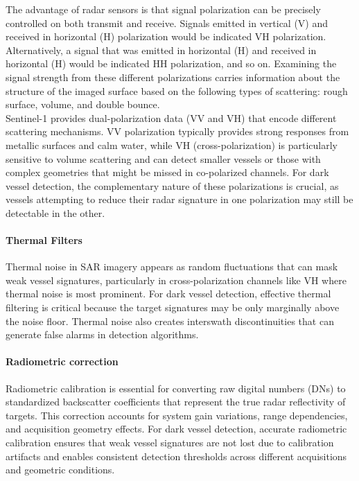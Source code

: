 \documentclass{article}
\begin{document}
	The advantage of radar sensors is that signal polarization can be precisely controlled on both transmit and receive. Signals emitted in vertical (V) and received in horizontal (H) polarization would be indicated VH polarization. Alternatively, a signal that was emitted in horizontal (H) and received in horizontal
	(H) would be indicated HH polarization, and so on. Examining the signal strength from these different polarizations carries information about the structure of the imaged surface based on the following types of scattering: rough surface, volume, and double bounce.\\
	
	
	Sentinel-1 provides dual-polarization data (VV and VH) that encode different scattering mechanisms. VV polarization typically provides strong responses from metallic surfaces and calm water, while VH (cross-polarization) is particularly sensitive to volume scattering and can detect smaller vessels or those with complex geometries that might be missed in co-polarized channels. For dark vessel detection, the complementary nature of these polarizations is crucial, as vessels attempting to reduce their radar signature in one polarization may still be detectable in the other.\\
	
	\paragraph{Thermal Filters}
	Thermal noise in SAR imagery appears as random fluctuations that can mask weak vessel signatures, particularly in cross-polarization channels like VH where thermal noise is most prominent. For dark vessel detection, effective thermal filtering is critical because the target signatures may be only marginally above the noise floor. Thermal noise also creates interswath discontinuities that can generate false alarms in detection algorithms. \\
	
	\paragraph{Radiometric correction}
	Radiometric calibration is essential for converting raw digital numbers (DNs) to standardized backscatter coefficients that represent the true radar reflectivity of targets. This correction accounts for system gain variations, range dependencies, and acquisition geometry effects. For dark vessel detection, accurate radiometric calibration ensures that weak vessel signatures are not lost due to calibration artifacts and enables consistent detection thresholds across different acquisitions and geometric conditions.
	
\end{document}

